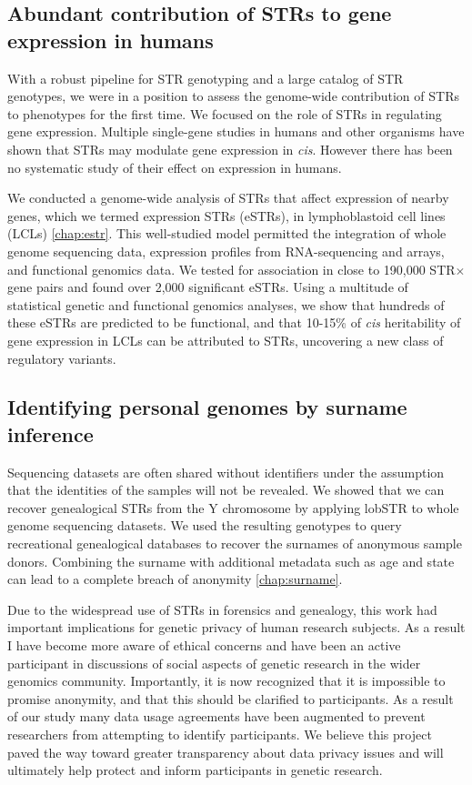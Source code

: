 \subsection{Abundant contribution of STRs to gene expression in humans}
With a robust pipeline for STR genotyping and a large catalog of STR genotypes, we were in a position to assess the genome-wide contribution of STRs to phenotypes for the first time. We focused on the role of STRs in regulating gene expression. Multiple single-gene studies in humans and other organisms have shown that STRs may modulate gene expression in \emph{cis}. However there has been no systematic study of their effect on expression in humans.

We conducted a genome-wide analysis of STRs that affect expression of nearby genes, which we termed expression STRs (eSTRs), in lymphoblastoid cell lines (LCLs) \cite{GymrekWillemsGuilmatreEtAl2015} \autoref{chap:estr}. This well-studied model permitted the integration of whole genome sequencing data, expression profiles from RNA-sequencing and arrays, and functional genomics data. We tested for association in close to 190,000 STR$\times$gene pairs and found over 2,000 significant eSTRs. Using a multitude of statistical genetic and functional genomics analyses, we show that hundreds of these eSTRs are predicted to be functional, and that 10-15\% of \emph{cis} heritability of gene expression in LCLs can be attributed to STRs, uncovering a new class of regulatory variants.

\subsection{Identifying personal genomes by surname inference}
Sequencing datasets are often shared without identifiers under the assumption that the identities of the samples will not be revealed. We showed that we can recover genealogical STRs from the Y chromosome by applying lobSTR to whole genome sequencing datasets. We used the resulting genotypes to query recreational genealogical databases to recover the surnames of anonymous sample donors. Combining the surname with additional metadata such as age and state can lead to a complete breach of anonymity \cite{GymrekMcGuireGolanEtAl2013} \autoref{chap:surname}.

Due to the widespread use of STRs in forensics and genealogy, this work had important implications for genetic privacy of human research subjects. As a result I have become more aware of ethical concerns and have been an active participant in discussions of social aspects of genetic research in the wider genomics community. Importantly, it is now recognized that it is impossible to promise anonymity, and that this should be clarified to participants. As a result of our study many data usage agreements have been augmented to prevent researchers from attempting to identify participants. We believe this project paved the way toward greater transparency about data privacy issues and will ultimately help protect and inform participants in genetic research.

